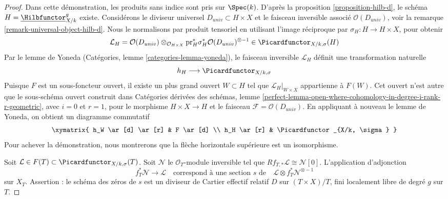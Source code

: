 \begin{proof}
Dans cette démonstration, les produits sans indice sont pris sur $\Spec(k)$.
D'après la proposition \ref{proposition-hilb-d}, le schéma
$H = \underline{\Hilbfunctor}^g_{X/k}$ existe.
Considérons le diviseur universel $D_{univ} \subset H \times X$
et le faisceau inversible associé $\mathcal{O}(D_{univ})$, voir
la remarque \ref{remark-universal-object-hilb-d}.
Nous le normalisons par produit tensoriel en utilisant l'image réciproque par
$\sigma_H : H \to H \times X$, pour obtenir
$$
\mathcal{L}_H =
\mathcal{O}(D_{univ})
\otimes_{\mathcal{O}_{H \times X}}
\text{pr}_H^*\sigma_H^*\mathcal{O}(D_{univ})^{\otimes -1}
\in
\Picardfunctor_{X/k, \sigma}(H)
$$
Par le lemme de Yoneda (Catégories, lemme \ref{categories-lemma-yoneda}),
le faisceau inversible $\mathcal{L}_H$ définit une transformation naturelle
$$
h_H \longrightarrow \Picardfunctor_{X/k, \sigma}
$$
Puisque $F$ est un sous-foncteur ouvert, il existe un plus grand ouvert
$W \subset H$ tel que $\mathcal{L}_H|_{W \times X}$ appartienne à
$F(W)$. Cet ouvert n'est autre que le
sous-schéma ouvert construit dans
Catégories dérivées des schémas, lemme
\ref{perfect-lemma-open-where-cohomology-in-degree-i-rank-r-geometric},
avec $i = 0$ et $r = 1$, pour le morphisme $H \times X \to H$ et le faisceau
$\mathcal{F} = \mathcal{O}(D_{univ})$. En appliquant à nouveau le lemme de Yoneda,
on obtient un diagramme commutatif
$$
\xymatrix{
h_W \ar[d] \ar[r] & F \ar[d] \\
h_H \ar[r] & \Picardfunctor_{X/k, \sigma}
}
$$
Pour achever la démonstration, nous montrerons que la flèche horizontale supérieure est un
isomorphisme.

\medskip\noindent
Soit $\mathcal{L} \in F(T) \subset \Picardfunctor_{X/k, \sigma}(T)$.
Soit $\mathcal{N}$ le $\mathcal{O}_T$-module inversible
tel que $Rf_{T, *}\mathcal{L} \cong \mathcal{N}[0]$.
L'application d'adjonction
$$
f_T^*\mathcal{N} \longrightarrow \mathcal{L}
\quad\text{correspond à une section }s\text{ de}\quad
\mathcal{L} \otimes f_T^*\mathcal{N}^{\otimes -1}
$$
sur $X_T$. Assertion : le schéma des zéros de $s$ est un diviseur de Cartier effectif
relatif $D$ sur $(T \times X)/T$, fini localement libre de degré $g$ sur $T$.


\end{proof}
